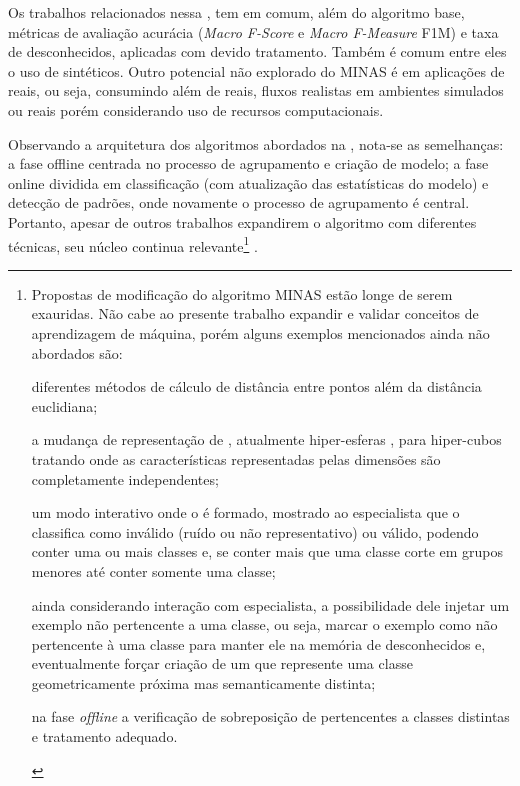 Os trabalhos relacionados nessa , tem em
comum, além do algoritmo base, métricas de avaliação acurácia (\emph{Macro F-Score} e \emph{Macro
F-Measure} F1M) e taxa de desconhecidos, aplicadas com devido tratamento.
Também é comum entre eles o uso de \datasets sintéticos.
Outro potencial não explorado do MINAS é em aplicações de reais, ou seja,
consumindo além de \datasets reais, fluxos realistas em ambientes simulados ou
reais porém considerando uso de recursos computacionais.

Observando a arquitetura dos algoritmos abordados na , nota-se as semelhanças:
a fase offline centrada no processo de agrupamento e criação de modelo;
a fase online dividida em classificação (com atualização das estatísticas do modelo)
e detecção de padrões, onde novamente o processo de agrupamento é central.
Portanto, apesar de outros trabalhos expandirem o algoritmo com diferentes técnicas, seu
núcleo continua relevante\footnote{
Propostas de modificação do algoritmo MINAS estão longe de serem exauridas.
Não cabe ao presente trabalho expandir e validar conceitos de aprendizagem de máquina,
porém alguns exemplos mencionados ainda não abordados são:
\begin{enumerate*}[label={\alph*)}]
    
    \item diferentes métodos de cálculo de distância entre pontos além da
    distância euclidiana;
    
    \item a mudança de representação de \clusters, atualmente hiper-esferas
    \cite{Costa2019thesis}, para hiper-cubos tratando \datasets onde as
    características representadas pelas dimensões são completamente
    independentes;
    
    \item um modo interativo onde o \cluster é formado, mostrado ao especialista
    que o classifica como inválido (ruído ou não representativo) ou válido,
    podendo conter uma ou mais classes e, se conter mais que uma classe corte em
    grupos menores até conter somente uma classe;
    
    \item ainda considerando interação com especialista, a possibilidade dele
    injetar um exemplo não pertencente a uma classe, ou seja, marcar o exemplo
    como não pertencente à uma classe para manter ele na memória de
    desconhecidos e, eventualmente forçar criação de um \cluster que represente
    uma classe geometricamente próxima mas semanticamente distinta;
    
    \item na fase \emph{offline} a verificação de sobreposição de \clusters
    pertencentes a classes distintas e tratamento adequado.

\end{enumerate*}
} \cite{DaSilva2018,DaSilva2018thesis,Costa2019}.

